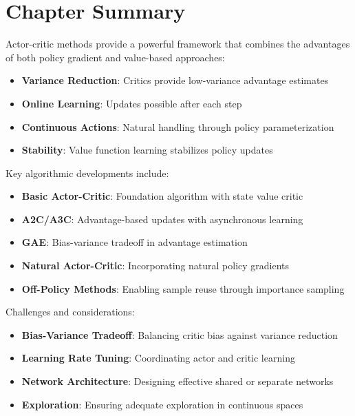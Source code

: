 \section{Chapter Summary}

Actor-critic methods provide a powerful framework that combines the advantages of both policy gradient and value-based approaches:

\begin{itemize}
    \item \textbf{Variance Reduction}: Critics provide low-variance advantage estimates
    \item \textbf{Online Learning}: Updates possible after each step
    \item \textbf{Continuous Actions}: Natural handling through policy parameterization
    \item \textbf{Stability}: Value function learning stabilizes policy updates
\end{itemize}

Key algorithmic developments include:
\begin{itemize}
    \item \textbf{Basic Actor-Critic}: Foundation algorithm with state value critic
    \item \textbf{A2C/A3C}: Advantage-based updates with asynchronous learning
    \item \textbf{GAE}: Bias-variance tradeoff in advantage estimation
    \item \textbf{Natural Actor-Critic}: Incorporating natural policy gradients
    \item \textbf{Off-Policy Methods}: Enabling sample reuse through importance sampling
\end{itemize}

Challenges and considerations:
\begin{itemize}
    \item \textbf{Bias-Variance Tradeoff}: Balancing critic bias against variance reduction
    \item \textbf{Learning Rate Tuning}: Coordinating actor and critic learning
    \item \textbf{Network Architecture}: Designing effective shared or separate networks
    \item \textbf{Exploration}: Ensuring adequate exploration in continuous spaces
\end{itemize}

